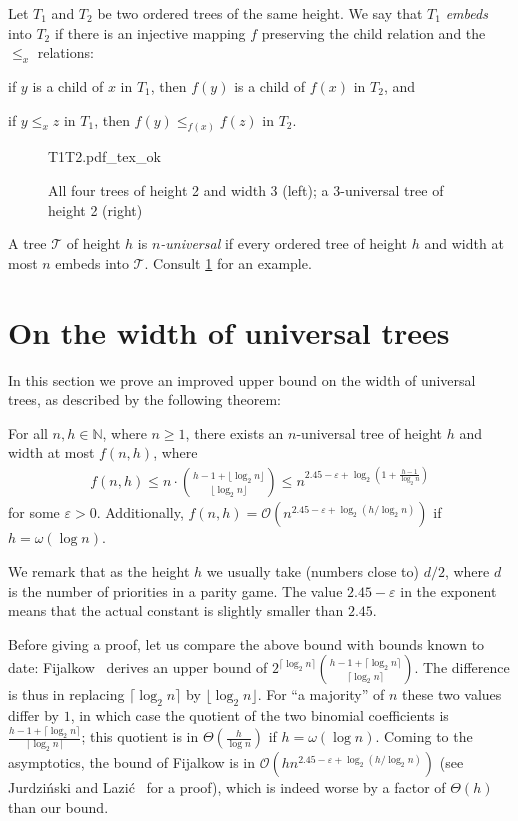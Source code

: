 \documentclass[envcountsect,envcountsame]{llncs}
\newcommand{\Oo}{\mathcal{O}}
\newcommand{\Tt}{\mathcal{T}}
\newcommand{\Nat}{\mathbb{N}}
\newcommand{\ceil}[1]{\lceil#1\rceil}
\newcommand{\floor}[1]{\lfloor#1\rfloor}
\newcommand{\fk}{f}
\newcommand{\obrazek}[1]{\def\svgscale{0.5}{#1.pdf_tex_ok}\vspace{-1ex}}
\begin{document}
	Let $T_1$ and $T_2$ be two ordered trees of the same height.
	We say that $T_1$ \emph{embeds} into $T_2$ if there is an injective mapping $f$ preserving the child relation and the $\leq_x$ relations:
	\begin{compactitem}
	\item	if $y$ is a child of $x$ in $T_1$, then $f(y)$ is a child of $f(x)$ in $T_2$, and
	\item	if $y\leq_x z$ in $T_1$, then $f(y)\leq_{f(x)} f(z)$ in $T_2$.
	\end{compactitem}
	
	\begin{figure}
		\centering
		\obrazek{T1T2}
		\caption{All four trees of height 2 and width 3 (left); a 3-universal tree of height 2 (right)}
		\label{fig:1}
	\end{figure}

	A tree $\Tt$ of height $h$ is \emph{$n$-universal} if every ordered tree of height $h$ and width at most $n$ embeds into $\Tt$.
	Consult \cref{fig:1} for an example.



\section{On the width of universal trees}

	In this section we prove an improved upper bound on the width of universal trees, as described by the following theorem:

	\begin{theorem}\label{thm:upper-bound}
		For all $n,h\in\Nat$, where $n\geq 1$, there exists an $n$-universal tree of height $h$ and width at most $\fk(n,h)$, where
		\begin{align*}
			\fk(n, h) \leq n\cdot\binom{h - 1 + \floor{\log_2 n}}{\floor{\log_2 n}}
				\leq n^{2{.}45-\varepsilon + \log_2 \left( 1 + \frac{h - 1}{\log_2 n} \right)}
		\end{align*}
		for some $\varepsilon>0$.
		Additionally, $\fk(n,h)=\Oo(n^{2{.}45-\varepsilon+\log_2(h/\log_2 n)})$ if $h=\omega(\log n)$.
	\end{theorem}

	We remark that as the height $h$ we usually take (numbers close to) $d/2$, where $d$ is the number of priorities in a parity game.
	The value $2{.}45-\varepsilon$ in the exponent means that the actual constant is slightly smaller than $2{.}45$.

	Before giving a proof, let us compare the above bound with bounds known to date:
	Fijalkow~\cite[Theorem 4]{fijalkow} derives an upper bound of $2^{\ceil{\log_2 n}} \binom{h - 1 + \ceil{\log_2 n}}{\ceil{\log_2 n}}$.
	The difference is thus in replacing $\ceil{\log_2 n}$ by $\floor{\log_2 n}$.
	For ``a majority'' of $n$ these two values differ by $1$, in which case the quotient of the two binomial coefficients is
	$\frac{h - 1 + \ceil{\log_2 n}}{\ceil{\log_2 n}}$;
	this quotient is in $\Theta\left(\frac{h}{\log n}\right)$ if $h=\omega(\log n)$.
	Coming to the asymptotics, the bound of Fijalkow is in $\Oo(hn^{2{.}45-\varepsilon+\log_2(h/\log_2 n)})$ (see Jurdziński and Lazić~\cite[Lemma 6]{progress-measure} for a proof),
	which is indeed worse by a factor of $\Theta(h)$ than our bound.
\end{document}
